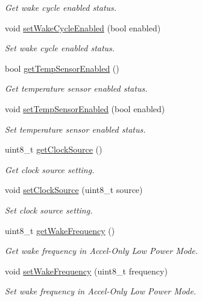 \begin{DoxyCompactItemize}
\begin{DoxyCompactList}\small\item\em Get wake cycle enabled status. \end{DoxyCompactList}\item 
void \mbox{\hyperlink{classMPU6050_a340eade71cf6286f6904c2021330944e}{set\+Wake\+Cycle\+Enabled}} (bool enabled)
\begin{DoxyCompactList}\small\item\em Set wake cycle enabled status. \end{DoxyCompactList}\item 
bool \mbox{\hyperlink{classMPU6050_a31f588beab6760258212c65725eba336}{get\+Temp\+Sensor\+Enabled}} ()
\begin{DoxyCompactList}\small\item\em Get temperature sensor enabled status. \end{DoxyCompactList}\item 
void \mbox{\hyperlink{classMPU6050_a0113871802e88c80fe69ce1f607987ff}{set\+Temp\+Sensor\+Enabled}} (bool enabled)
\begin{DoxyCompactList}\small\item\em Set temperature sensor enabled status. \end{DoxyCompactList}\item 
uint8\+\_\+t \mbox{\hyperlink{classMPU6050_a8ed670258a805807b5102cdc5d0996a8}{get\+Clock\+Source}} ()
\begin{DoxyCompactList}\small\item\em Get clock source setting. \end{DoxyCompactList}\item 
void \mbox{\hyperlink{classMPU6050_a4c1cd147d038e024bdeaa053c4d77734}{set\+Clock\+Source}} (uint8\+\_\+t source)
\begin{DoxyCompactList}\small\item\em Set clock source setting. \end{DoxyCompactList}\item 
uint8\+\_\+t \mbox{\hyperlink{classMPU6050_a249a905ae4572a462414f2d94236258a}{get\+Wake\+Frequency}} ()
\begin{DoxyCompactList}\small\item\em Get wake frequency in Accel-\/\+Only Low Power Mode. \end{DoxyCompactList}\item 
void \mbox{\hyperlink{classMPU6050_a62495e89f4787e6b18f0f795cef2b7cd}{set\+Wake\+Frequency}} (uint8\+\_\+t frequency)
\begin{DoxyCompactList}\small\item\em Set wake frequency in Accel-\/\+Only Low Power Mode. \end{DoxyCompactList}\item 

\end{DoxyCompactItemize}

